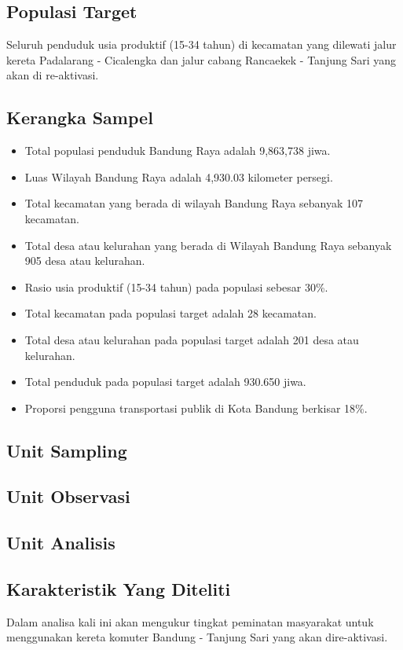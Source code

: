 \documentclass{article}
\begin{document}
\subsection{Populasi Target}
Seluruh penduduk usia produktif (15-34 tahun) di kecamatan yang dilewati jalur kereta Padalarang - Cicalengka dan jalur cabang Rancaekek - Tanjung Sari yang akan di re-aktivasi.
\subsection{Kerangka Sampel}
\begin{itemize}
    \item Total populasi penduduk Bandung Raya adalah 9,863,738 jiwa.
    \item Luas Wilayah Bandung Raya adalah 4,930.03 kilometer persegi.
    \item Total kecamatan yang berada di wilayah Bandung Raya sebanyak 107 kecamatan.
    \item Total desa atau kelurahan yang berada di Wilayah Bandung Raya sebanyak 905 desa atau kelurahan.
    \item Rasio usia produktif (15-34 tahun) pada populasi sebesar 30\%.
    \item Total kecamatan pada populasi target adalah 28 kecamatan.
    \item Total desa atau kelurahan pada populasi target adalah 201 desa atau kelurahan.
    \item Total penduduk pada populasi target adalah 930.650 jiwa.
    \item Proporsi pengguna transportasi publik di Kota Bandung berkisar 18\%.
\end{itemize}

\subsection{Unit Sampling} 

\subsection{Unit Observasi}

\subsection{Unit Analisis}

\subsection{Karakteristik Yang Diteliti}
Dalam analisa kali ini akan mengukur tingkat peminatan masyarakat untuk menggunakan kereta komuter Bandung - Tanjung Sari yang akan dire-aktivasi.
\end{document}
